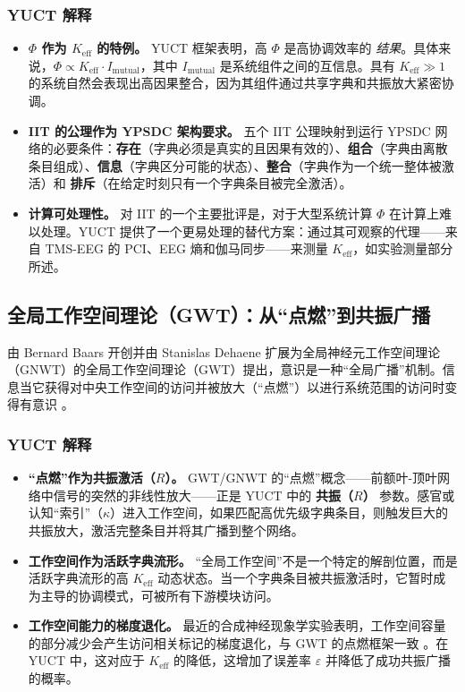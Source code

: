 \documentclass[12pt,a4paper]{article}
\begin{document}
	\subsubsection*{YUCT 解释}
	\begin{itemize}
		\item \textbf{\(\Phi\) 作为 $K_{\mathrm{eff}}$ 的特例。} YUCT 框架表明，高 $\Phi$ 是高协调效率的 \textit{结果}。具体来说，$\Phi \propto K_{\mathrm{eff}} \cdot I_{\text{mutual}}$，其中 $I_{\text{mutual}}$ 是系统组件之间的互信息。具有 $K_{\mathrm{eff}} \gg 1$ 的系统自然会表现出高因果整合，因为其组件通过共享字典和共振放大紧密协调。
		\item \textbf{IIT 的公理作为 YPSDC 架构要求。} 五个 IIT 公理映射到运行 YPSDC 网络的必要条件：\textbf{存在}（字典必须是真实的且因果有效的）、\textbf{组合}（字典由离散条目组成）、\textbf{信息}（字典区分可能的状态）、\textbf{整合}（字典作为一个统一整体被激活）和 \textbf{排斥}（在给定时刻只有一个字典条目被完全激活）。
		\item \textbf{计算可处理性。} 对 IIT 的一个主要批评是，对于大型系统计算 $\Phi$ 在计算上难以处理。YUCT 提供了一个更易处理的替代方案：通过其可观察的代理——来自 TMS-EEG 的 PCI、EEG 熵和伽马同步——来测量 $K_{\mathrm{eff}}$，如实验测量部分所述。
	\end{itemize}
	
	\subsection{全局工作空间理论（GWT）：从“点燃”到共振广播}
	
	由 Bernard Baars 开创并由 Stanislas Dehaene 扩展为全局神经元工作空间理论（GNWT）的全局工作空间理论（GWT）提出，意识是一种“全局广播”机制。信息当它获得对中央工作空间的访问并被放大（“点燃”）以进行系统范围的访问时变得有意识 \cite{Baars1988, Dehaene2014}。
	
	\subsubsection*{YUCT 解释}
	\begin{itemize}
		\item \textbf{“点燃”作为共振激活（\(R\)）。} GWT/GNWT 的“点燃”概念——前额叶-顶叶网络中信号的突然的非线性放大——正是 YUCT 中的 \textbf{共振（\(R\)）} 参数。感官或认知“索引”（\(\kappa\)）进入工作空间，如果匹配高优先级字典条目，则触发巨大的共振放大，激活完整条目并将其广播到整个网络。
		\item \textbf{工作空间作为活跃字典流形。} “全局工作空间”不是一个特定的解剖位置，而是活跃字典流形的高 $K_{\mathrm{eff}}$ 动态状态。当一个字典条目被共振激活时，它暂时成为主导的协调模式，可被所有下游模块访问。
		\item \textbf{工作空间能力的梯度退化。} 最近的合成神经现象学实验表明，工作空间容量的部分减少会产生访问相关标记的梯度退化，与 GWT 的点燃框架一致 \cite{Phua2026}。在 YUCT 中，这对应于 $K_{\mathrm{eff}}$ 的降低，这增加了误差率 $\varepsilon$ 并降低了成功共振广播的概率。
	\end{itemize}
	
\end{document}
